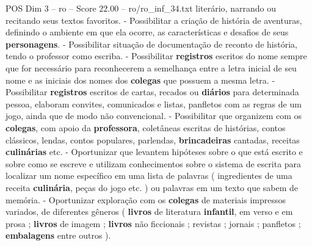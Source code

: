 \begin{textsample}{POS Dim 3 – ro – Score 22.00 – ro/ro\_inf\_34.txt}
literário, narrando ou recitando seus textos favoritos. - Possibilitar a criação de história de aventuras, definindo o ambiente em que ela ocorre, as características e desafios de seus \textbf{personagens}. - Possibilitar situação de documentação de reconto de história, tendo o professor como escriba. - Possibilitar \textbf{registros} escritos do nome sempre que for necessário para reconhecerem a semelhança entre a letra inicial de seu nome e as iniciais dos nomes dos \textbf{colegas} que possuem a mesma letra. - Possibilitar \textbf{registros} escritos de cartas, recados ou \textbf{diários} para determinada pessoa, elaboram convites, comunicados e listas, panfletos com as regras de um jogo, ainda que de modo não convencional. - Possibilitar que organizem com os \textbf{colegas}, com apoio da \textbf{professora}, coletâneas escritas de histórias, contos clássicos, lendas, contos populares, parlendas, \textbf{brincadeiras} cantadas, receitas \textbf{culinárias} etc. - Oportunizar que levantem hipóteses sobre o que está escrito e sobre como se escreve e utilizam conhecimentos sobre o sistema de escrita para localizar um nome específico em uma lista de palavras ( ingredientes de uma receita \textbf{culinária}, peças do jogo etc. ) ou palavras em um texto que sabem de memória. - Oportunizar exploração com os \textbf{colegas} de materiais impressos variados, de diferentes gêneros ( \textbf{livros} de literatura \textbf{infantil}, em verso e em prosa ; \textbf{livros} de imagem ; \textbf{livros} não ficcionais ; revistas ; jornais ; panfletos ; \textbf{embalagens} entre outros ).

\end{textsample}
